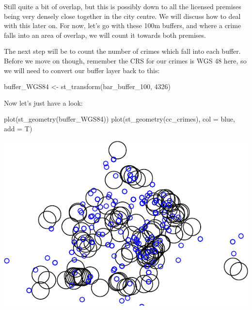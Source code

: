 \documentclass[
]{book}
\makeatletter
\newenvironment{Shaded}{\begin{snugshade}}{\end{snugshade}}
\newcommand{\AttributeTok}[1]{\textcolor[rgb]{0.61,0.61,0.61}{#1}}
\newcommand{\DecValTok}[1]{\textcolor[rgb]{0.06,0.06,0.06}{#1}}
\newcommand{\FunctionTok}[1]{\textcolor[rgb]{0,0,0}{#1}}
\newcommand{\NormalTok}[1]{#1}
\newcommand{\OtherTok}[1]{\textcolor[rgb]{0.37,0.37,0.37}{#1}}
\newcommand{\StringTok}[1]{\textcolor[rgb]{0.5,0.5,0.5}{#1}}
\newenvironment{kframe}{%
\medskip{}
\setlength{\fboxsep}{.8em}
 \def\at@end@of@kframe{}%
 \ifinner\ifhmode%
  \def\at@end@of@kframe{\end{minipage}}%
  \begin{minipage}{\columnwidth}%
 \fi\fi%
 \def\FrameCommand##1{\hskip\@totalleftmargin \hskip-\fboxsep
 \colorbox{shadecolor}{##1}\hskip-\fboxsep
     \hskip-\linewidth \hskip-\@totalleftmargin \hskip\columnwidth}%
 \MakeFramed {\advance\hsize-\width
   \@totalleftmargin\z@ \linewidth\hsize
   \@setminipage}}%
 {\par\unskip\endMakeFramed%
 \at@end@of@kframe}
\renewenvironment{Shaded}{\begin{kframe}}{\end{kframe}}
\makeatother
\begin{document}
Still quite a bit of overlap, but this is possibly down to all the licensed premises being very densely close together in the city centre. We will discuss how to deal with this later on. For now, let's go with these 100m buffers, and where a crime falls into an area of overlap, we will count it towards both premises.

The next step will be to count the number of crimes which fall into each buffer. Before we move on though, remember the CRS for our crimes is WGS 48 here, so we will need to convert our buffer layer back to this:

\begin{Shaded}
\begin{Highlighting}[]
\NormalTok{buffer\_WGS84 }\OtherTok{\textless{}{-}} \FunctionTok{st\_transform}\NormalTok{(bar\_buffer\_100, }\DecValTok{4326}\NormalTok{)}
\end{Highlighting}
\end{Shaded}

Now let's just have a look:

\begin{Shaded}
\begin{Highlighting}[]
\FunctionTok{plot}\NormalTok{(}\FunctionTok{st\_geometry}\NormalTok{(buffer\_WGS84))}
\FunctionTok{plot}\NormalTok{(}\FunctionTok{st\_geometry}\NormalTok{(cc\_crimes), }\AttributeTok{col =} \StringTok{\textquotesingle{}blue\textquotesingle{}}\NormalTok{, }\AttributeTok{add =}\NormalTok{ T)}
\end{Highlighting}
\end{Shaded}

\includegraphics{crime_mapping_files/figure-latex/crimes_and_buffers-1.pdf}
\end{document}

